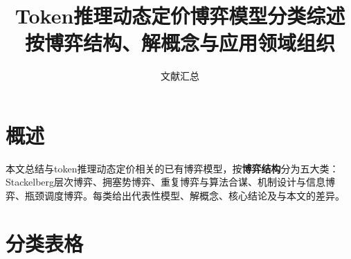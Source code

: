 \documentclass[11pt]{article}
\title{\textbf{Token推理动态定价博弈模型分类综述}\\\large 按博弈结构、解概念与应用领域组织}
\author{文献汇总}
\date{}
\begin{document}
\maketitle

\section{概述}

本文总结与token推理动态定价相关的已有博弈模型，按\textbf{博弈结构}分为五大类：Stackelberg层次博弈、拥塞势博弈、重复博弈与算法合谋、机制设计与信息博弈、瓶颈调度博弈。每类给出代表性模型、解概念、核心结论及与本文的差异。

\section{分类表格}
\end{document}
